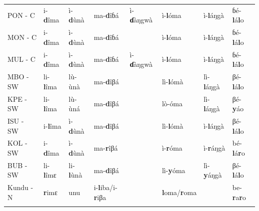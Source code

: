 \documentclass[output=paper,colorlinks,citecolor=brown
]{langscibook}
\begin{document}
\begin{table}
{\begin{tabular}{llllllll}
PON - C                   & i-\textbf{d}îma                       & ì-\textbf{d}ùnà                & ma-\textbf{d}îɓá                 & ì-\textbf{ɗ}àŋgwà           & ì-\textbf{l}óma               & ì-\textbf{l}áŋgà             & ɓé-\textbf{l}á\textbf{l}o               \\
MON - C                   & i-\textbf{d}îma                       & ì-\textbf{d}ùnà                & ma-\textbf{d}îɓá                 &                       & ì-\textbf{l}óma               & ì-\textbf{l}áŋgà             & ɓé-\textbf{l}á\textbf{l}o               \\
MUL - C                   & i-\textbf{d}îma                       & ì-\textbf{d}ùnà                & ma-\textbf{d}îɓá                 & ì-\textbf{ɗ}àŋgwà           & ì-\textbf{l}óma               & ì-\textbf{l}áŋgà             & ɓé-\textbf{l}á\textbf{l}o               \\
MBO - SW                  & li-\textbf{l}îma                      & lù-ùnà                & ma-\textbf{d}îβá                 &                       & lì-\textbf{l}ómà             & lì-\textbf{l}áŋgà            & βé-\textbf{l}á\textbf{l}o                 \\
KPE - SW                  & li-\textbf{l}îma                      & lù-ùná                & ma-\textbf{d}îβá                 &                       & lò-óma               & lì-\textbf{l}áŋgà            & βé-\textbf{y}áo                  \\
ISU - SW                  & i-\textbf{l}îma                       & ì-\textbf{d}ùnà                & ma-\textbf{d}îβá                 &                       & lì-\textbf{l}ómà             & ì-\textbf{l}áŋgà             & βé-\textbf{l}á\textbf{l}o                 \\
KOL - SW                  & i-\textbf{d}îma                       & ì-\textbf{d}ùnà                & ma-\textbf{r}îβá                 &                       & ì-\textbf{r}óma               & ì-\textbf{r}áŋgà             & bé-\textbf{l}á\textbf{r}o               \\
BUB - SW                  & li-\textbf{l}îmɛ                      & li-\textbf{l}ùnà               & ma-\textbf{d}îβá                 &                       & lì-\textbf{y}óma              & lì-\textbf{y}áŋgà            & βé-\textbf{l}á\textbf{l}o                 \\
Kundu - N                 & \textbf{r}imɛ                         & unu                   & i-\textbf{l}iba/i-\textbf{r}iβa           &                       & \textbf{l}oma/\textbf{r}oma              &                        & be-\textbf{r}a\textbf{r}o            \\ 
   \lspbottomrule
 \end{tabular}
 }
\end{table}
\end{document}
